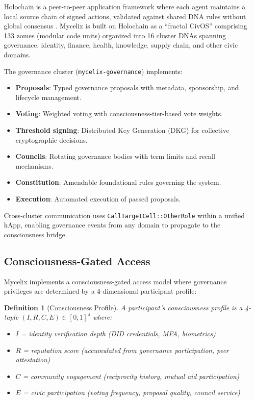 \documentclass[11pt,a4paper]{article}
\newtheorem{definition}{Definition}
\begin{document}
Holochain is a peer-to-peer application framework where each agent maintains a local source chain of signed actions, validated against shared DNA rules without global consensus \citep{harris2018holochain}.
Mycelix is built on Holochain as a ``fractal CivOS'' comprising 133 zomes (modular code units) organized into 16 cluster DNAs spanning governance, identity, finance, health, knowledge, supply chain, and other civic domains.

The governance cluster (\texttt{mycelix-governance}) implements:
\begin{itemize}
  \item \textbf{Proposals}: Typed governance proposals with metadata, sponsorship, and lifecycle management.
  \item \textbf{Voting}: Weighted voting with consciousness-tier-based vote weights.
  \item \textbf{Threshold signing}: Distributed Key Generation (DKG) for collective cryptographic decisions.
  \item \textbf{Councils}: Rotating governance bodies with term limits and recall mechanisms.
  \item \textbf{Constitution}: Amendable foundational rules governing the system.
  \item \textbf{Execution}: Automated execution of passed proposals.
\end{itemize}

Cross-cluster communication uses \texttt{CallTargetCell::OtherRole} within a unified hApp, enabling governance events from any domain to propagate to the consciousness bridge.

\subsection{Consciousness-Gated Access}

Mycelix implements a consciousness-gated access model where governance privileges are determined by a 4-dimensional participant profile:

\begin{definition}[Consciousness Profile]
A participant's consciousness profile is a 4-tuple $(I, R, C, E) \in [0,1]^4$ where:
\begin{itemize}
  \item $I$ = identity verification depth (DID credentials, MFA, biometrics)
  \item $R$ = reputation score (accumulated from governance participation, peer attestation)
  \item $C$ = community engagement (reciprocity history, mutual aid participation)
  \item $E$ = civic participation (voting frequency, proposal quality, council service)
\end{itemize}
\end{definition}
\end{document}
